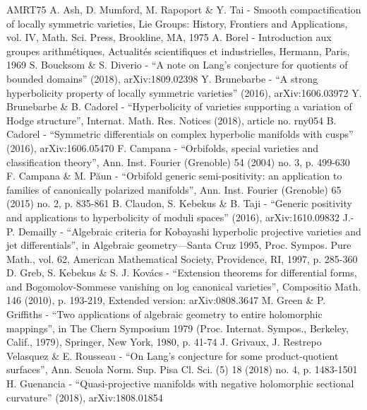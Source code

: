 \documentclass[10pt]{article}
\theoremstyle{definition}
\theoremstyle{remark}
\numberwithin{equation}{theorem}
\begin{document}

\begin{thebibliography}{AMRT75}
 A. Ash, D. Mumford, M. Rapoport \& Y. Tai - Smooth compactification of locally symmetric varieties, Lie Groups: History, Frontiers and Applications, vol. IV, Math. Sci. Press, Brookline, MA, 1975
 A. Borel - Introduction aux groupes arithmétiques, Actualités scientifiques et industrielles, Hermann, Paris, 1969
 S. Boucksom \& S. Diverio - “A note on Lang’s conjecture for quotients of bounded domains” (2018), arXiv:1809.02398
 Y. Brunebarbe - “A strong hyperbolicity property of locally symmetric varieties” (2016), arXiv:1606.03972
 Y. Brunebarbe \& B. Cadorel - “Hyperbolicity of varieties supporting a variation of Hodge structure”, Internat. Math. Res. Notices (2018), article no. rny054
 B. Cadorel - “Symmetric differentials on complex hyperbolic manifolds with cusps” (2016), arXiv:1606.05470
 F. Campana - “Orbifolds, special varieties and classification theory”, Ann. Inst. Fourier (Grenoble) 54 (2004) no. 3, p. 499-630
 F. Campana \& M. Păun - “Orbifold generic semi-positivity: an application to families of canonically polarized manifolds”, Ann. Inst. Fourier (Grenoble) 65 (2015) no. 2, p. 835-861
 B. Claudon, S. Kebekus \& B. Taji - “Generic positivity and applications to hyperbolicity of moduli spaces” (2016), arXiv:1610.09832
 J.-P. Demailly - “Algebraic criteria for Kobayashi hyperbolic projective varieties and jet differentials”, in Algebraic geometry—Santa Cruz 1995, Proc. Sympos. Pure Math., vol. 62, American Mathematical Society, Providence, RI, 1997, p. 285-360
 D. Greb, S. Kebekus \& S. J. Kovács - “Extension theorems for differential forms, and Bogomolov-Sommese vanishing on log canonical varieties”, Compositio Math. 146 (2010), p. 193-219, Extended version: arXiv:0808.3647
 M. Green \& P. Griffiths - “Two applications of algebraic geometry to entire holomorphic mappings”, in The Chern Symposium 1979 (Proc. Internat. Sympos., Berkeley, Calif., 1979), Springer, New York, 1980, p. 41-74
 J. Grivaux, J. Restrepo Velasquez \& E. Rousseau - “On Lang’s conjecture for some product-quotient surfaces”, Ann. Scuola Norm. Sup. Pisa Cl. Sci. (5) 18 (2018) no. 4, p. 1483-1501
 H. Guenancia - “Quasi-projective manifolds with negative holomorphic sectional curvature” (2018), arXiv:1808.01854

\end{thebibliography}
\end{document}
